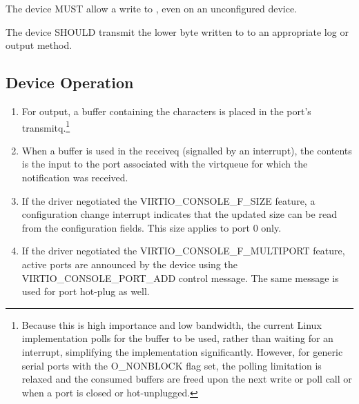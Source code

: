 
The device MUST allow a write to , even on an
unconfigured device.

The device SHOULD transmit the lower byte written to  to
an appropriate log or output method.

\subsection{Device Operation}\label{sec:Device Types / Console Device / Device Operation}

\begin{enumerate}
\item For output, a buffer containing the characters is placed in
  the port's transmitq.\footnote{Because this is high importance and low bandwidth, the current
Linux implementation polls for the buffer to be used, rather than
waiting for an interrupt, simplifying the implementation
significantly. However, for generic serial ports with the
O_NONBLOCK flag set, the polling limitation is relaxed and the
consumed buffers are freed upon the next write or poll call or
when a port is closed or hot-unplugged.
}

\item When a buffer is used in the receiveq (signalled by an
  interrupt), the contents is the input to the port associated
  with the virtqueue for which the notification was received.

\item If the driver negotiated the VIRTIO_CONSOLE_F_SIZE feature, a
  configuration change interrupt indicates that the updated size can
  be read from the configuration fields.  This size applies to port 0 only.

\item If the driver negotiated the VIRTIO_CONSOLE_F_MULTIPORT
  feature, active ports are announced by the device using the
  VIRTIO_CONSOLE_PORT_ADD control message. The same message is
  used for port hot-plug as well.
\end{enumerate}


